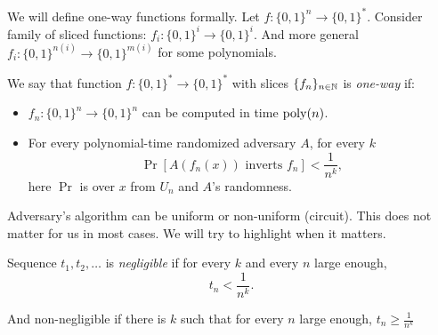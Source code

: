 We will define one-way functions formally.
Let $f \colon \{0, 1\}^n \to \{0, 1\}^*$.
Consider family of sliced functions: $f_i \colon \{0, 1\}^i \to \{0, 1\}^i$.
And more general $f_i \colon \{0, 1\}^{n(i)} \to \{0, 1\}^{m(i)}$ for some polynomials.
\begin{definition}
    We say that function $f \colon \{0, 1\}^* \to \{0, 1\}^*$ with slices $\{f_n\}_{n \in \mathbb{N}}$ is \emph{one-way} if:
    \begin{itemize}
        \item $f_n \colon \{0, 1\}^n \to \{0, 1\}^n$ can be computed in time $\operatorname{poly}(n)$.
        \item For every polynomial-time randomized adversary $A$, for every $k$
        \[
            \Pr[A(f_n(x)) \text{ inverts } f_n] < \frac 1 {n^k},
        \] here $\Pr$ is over $x$ from $U_n$ and $A$'s randomness.
    \end{itemize}
\end{definition}

Adversary's algorithm can be uniform or non-uniform (circuit).
This does not matter for us in most cases.
We will try to highlight when it matters.

\begin{definition}
    Sequence $t_1, t_2, \ldots$ is \emph{negligible} if for every $k$ and every $n$ large enough,
    \[
        t_n < \frac 1 {n^k}.
    \]

    And non-negligible if there is $k$ such that for every $n$ large enough, $t_n \geq \frac 1 {n^k}$
\end{definition}


